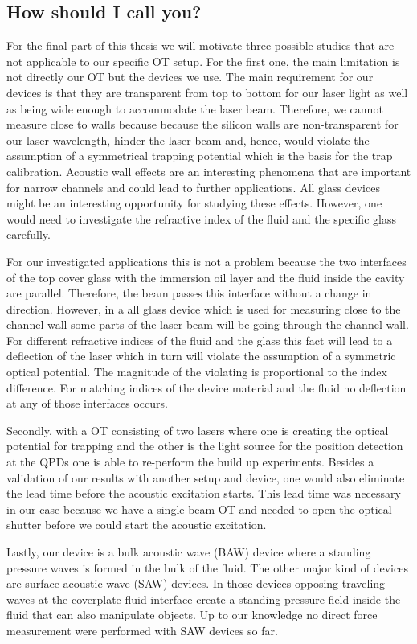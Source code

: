 \subsection{How should I call you?}

For the final part of this thesis we will motivate three possible studies that 
are not applicable to our specific OT setup. For the first one, the main 
limitation is not directly our OT but the devices we use. The main requirement 
for our devices is that they are transparent from top to bottom for our laser 
light as well as being wide enough to accommodate the laser beam. Therefore, we 
cannot measure close to walls because because the silicon walls are 
non-transparent for our laser wavelength, hinder the laser beam and, hence, 
would violate the assumption of a symmetrical trapping potential which is the 
basis for the trap calibration. Acoustic wall effects are an interesting 
phenomena that are important for narrow channels and could lead to further 
applications. All glass devices might be an interesting opportunity for 
studying these effects. However, one would need to investigate the refractive 
index of the fluid and the specific glass carefully.

For our investigated applications this is not a problem because the two 
interfaces of the top cover glass with the immersion oil layer and the fluid 
inside the cavity are parallel. Therefore, the beam passes this interface 
without a change in direction. However, in a all glass device which is used for 
measuring close to the channel wall some parts of the laser beam will be going 
through the channel wall. For different refractive indices of the fluid and the 
glass this fact will lead to a deflection of the laser which in turn will 
violate the assumption of a symmetric optical potential. The magnitude of the 
violating is proportional to the index difference. For matching indices of the 
device material and the fluid no deflection at any of those interfaces occurs.

Secondly, with a OT consisting of two lasers where one is creating the optical 
potential for trapping and the other is the light source for the position 
detection at the QPDs one is able to re-perform the build up experiments.  
Besides a validation of our results with another setup and device, one would 
also eliminate the lead time before the acoustic excitation starts. This lead 
time was necessary in our case because we have a single beam OT and needed to 
open the optical shutter before we could start the acoustic excitation.

Lastly, our device is a bulk acoustic wave (BAW) device where a standing 
pressure waves is formed in the bulk of the fluid. The other major kind of 
devices are surface acoustic wave (SAW) devices. In those devices opposing 
traveling waves at the coverplate-fluid interface create a standing pressure 
field inside the fluid that can also manipulate objects. Up to our knowledge no 
direct force measurement were performed with SAW devices so far.
